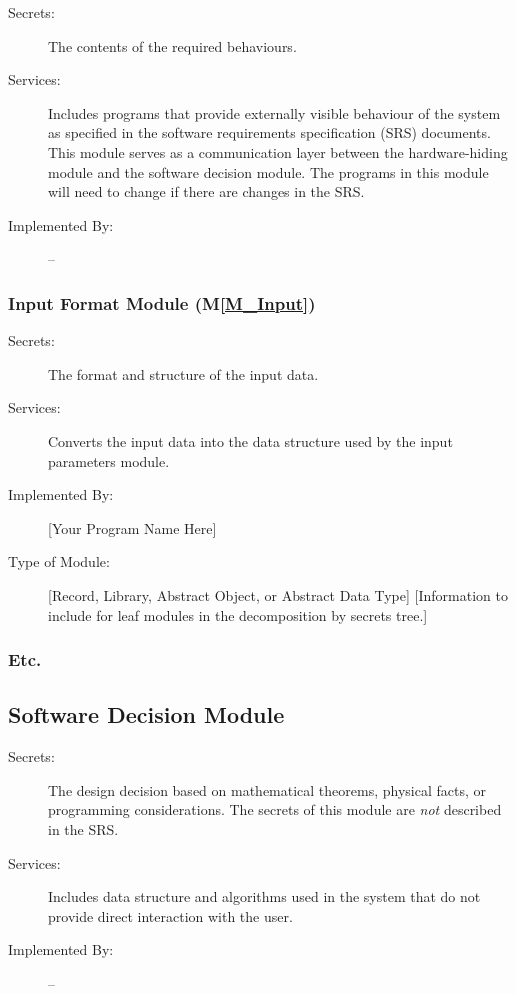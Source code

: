 \documentclass[12pt, titlepage]{article}
\newcommand{\mref}[1]{M\ref{#1}}
\begin{document}
\begin{description}
\item[Secrets:]The contents of the required behaviours.
\item[Services:]Includes programs that provide externally visible behaviour of
  the system as specified in the software requirements specification (SRS)
  documents. This module serves as a communication layer between the
  hardware-hiding module and the software decision module. The programs in this
  module will need to change if there are changes in the SRS.
\item[Implemented By:] --
\end{description}

\subsubsection{Input Format Module (\mref{M_Input})}

\begin{description}
\item[Secrets:]The format and structure of the input data.
\item[Services:]Converts the input data into the data structure used by the
  input parameters module.
\item[Implemented By:] [Your Program Name Here]
\item[Type of Module:] [Record, Library, Abstract Object, or Abstract Data Type]
  [Information to include for leaf modules in the decomposition by secrets tree.]
\end{description}

\subsubsection{Etc.}


\subsection{Software Decision Module}

\begin{description}
\item[Secrets:] The design decision based on mathematical theorems, physical
  facts, or programming considerations. The secrets of this module are
  \emph{not} described in the SRS.
\item[Services:] Includes data structure and algorithms used in the system that
  do not provide direct interaction with the user. 
\item[Implemented By:] --
\end{description}
\end{document}
